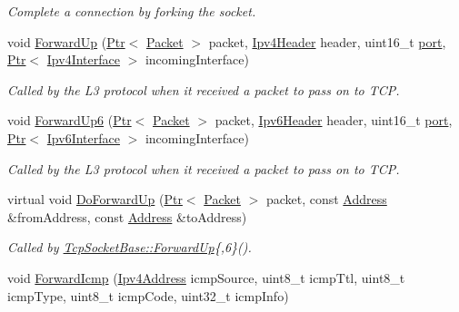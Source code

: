\begin{DoxyCompactItemize}
\begin{DoxyCompactList}\small\item\em Complete a connection by forking the socket. \end{DoxyCompactList}\item 
void \hyperlink{classns3_1_1TcpSocketBase_a2ebbcb9713facc9481341fcd972cdd82}{Forward\+Up} (\hyperlink{classns3_1_1Ptr}{Ptr}$<$ \hyperlink{classns3_1_1Packet}{Packet} $>$ packet, \hyperlink{classns3_1_1Ipv4Header}{Ipv4\+Header} header, uint16\+\_\+t \hyperlink{visualizer-ideas_8txt_a21ff1c530daf8435e00048b7fc2c58e3}{port}, \hyperlink{classns3_1_1Ptr}{Ptr}$<$ \hyperlink{classns3_1_1Ipv4Interface}{Ipv4\+Interface} $>$ incoming\+Interface)
\begin{DoxyCompactList}\small\item\em Called by the L3 protocol when it received a packet to pass on to T\+CP. \end{DoxyCompactList}\item 
void \hyperlink{classns3_1_1TcpSocketBase_aa0cd34b3562685596b2c3fd1e6a42a6f}{Forward\+Up6} (\hyperlink{classns3_1_1Ptr}{Ptr}$<$ \hyperlink{classns3_1_1Packet}{Packet} $>$ packet, \hyperlink{classns3_1_1Ipv6Header}{Ipv6\+Header} header, uint16\+\_\+t \hyperlink{visualizer-ideas_8txt_a21ff1c530daf8435e00048b7fc2c58e3}{port}, \hyperlink{classns3_1_1Ptr}{Ptr}$<$ \hyperlink{classns3_1_1Ipv6Interface}{Ipv6\+Interface} $>$ incoming\+Interface)
\begin{DoxyCompactList}\small\item\em Called by the L3 protocol when it received a packet to pass on to T\+CP. \end{DoxyCompactList}\item 
virtual void \hyperlink{classns3_1_1TcpSocketBase_ad5e7b21b9e9371bf9c19da5d3c56aac1}{Do\+Forward\+Up} (\hyperlink{classns3_1_1Ptr}{Ptr}$<$ \hyperlink{classns3_1_1Packet}{Packet} $>$ packet, const \hyperlink{classns3_1_1Address}{Address} \&from\+Address, const \hyperlink{classns3_1_1Address}{Address} \&to\+Address)
\begin{DoxyCompactList}\small\item\em Called by \hyperlink{classns3_1_1TcpSocketBase_a2ebbcb9713facc9481341fcd972cdd82}{Tcp\+Socket\+Base\+::\+Forward\+Up}\{,6\}(). \end{DoxyCompactList}\item 
void \hyperlink{classns3_1_1TcpSocketBase_ad4887f46646734366ae435dbca13e3fd}{Forward\+Icmp} (\hyperlink{classns3_1_1Ipv4Address}{Ipv4\+Address} icmp\+Source, uint8\+\_\+t icmp\+Ttl, uint8\+\_\+t icmp\+Type, uint8\+\_\+t icmp\+Code, uint32\+\_\+t icmp\+Info)

\end{DoxyCompactItemize}
